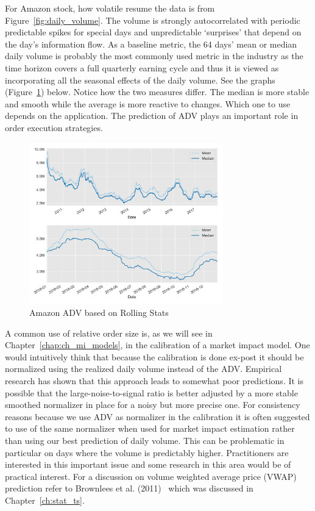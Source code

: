 For Amazon stock, how volatile resume the data is from Figure~\ref{fig:daily_volume}. The volume is strongly autocorrelated with periodic predictable spikes for special days and unpredictable `surprises' that depend on the day's information flow. As a baseline metric, the 64 days' mean or median daily volume is probably the most commonly used metric in the industry as the time horizon covers a full quarterly earning cycle and thus it is viewed as incorporating all the seasonal effects of the daily volume. See the graphs (Figure~\ref{fig:adv}) below. Notice how the two measures differ. The median is more stable and smooth while the average is more reactive to changes. Which one to use depends on the application. The prediction of ADV plays an important role in order execution strategies. 
	\begin{figure}[!ht]
	\centering
	\includegraphics[width=0.75\textwidth]{chapters/chapter_trade_data_models/figures/adv.png} 
	\caption{Amazon ADV based on Rolling Stats\label{fig:adv}}
	\end{figure}


 A common use of relative order size is, as we will see in Chapter~\ref{chap:ch_mi_models}, in the calibration of a market impact model. One would intuitively think that because the calibration is done ex-post it should be normalized using the realized daily volume instead of the ADV. Empirical research has shown that this approach leads to somewhat poor predictions. It is possible that the large-noise-to-signal ratio is better adjusted by a more stable smoothed normalizer in place for a noisy but more precise one. For consistency reasons because we use ADV as normalizer in the calibration it is often suggested to use of the same normalizer when used for market impact estimation rather than using our best prediction of daily volume. This can be problematic in particular on days where the volume is predictably higher. Practitioners are interested in this important issue and some research in this area would be of practical interest. For a discussion on volume weighted average price (VWAP) prediction refer to Brownlees et al. (2011)~\cite{brownless} which was discussed in Chapter~\ref{ch:stat_ts}.



